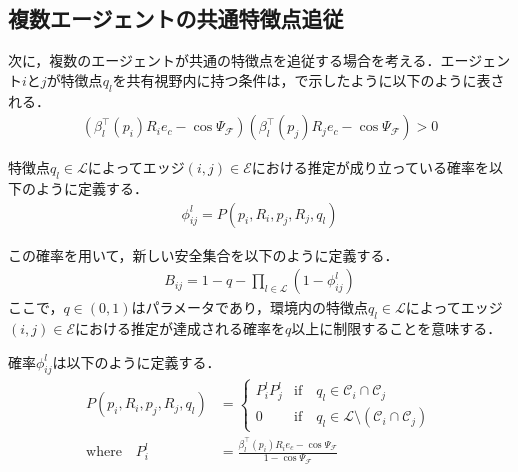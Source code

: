 \subsection{複数エージェントの共通特徴点追従}

次に，複数のエージェントが共通の特徴点を追従する場合を考える．エージェント$i$と$j$が特徴点$q_l$を共有視野内に持つ条件は，で示したように以下のように表される．
\begin{equation}
\begin{aligned}
(\beta_l^{\top}(p_i)R_ie_c-\cos\Psi_\mathcal{F})(\beta_l^{\top}(p_j)R_je_c-\cos\Psi_\mathcal{F}) > 0
\label{eq:shared_fov_condition_repeat}
\end{aligned}
\end{equation}

特徴点$q_l \in \mathcal{L}$によってエッジ$(i,j) \in \mathcal{E}$における推定が成り立っている確率を以下のように定義する．
\begin{equation}
\begin{aligned}
\phi_{ij}^l = P(p_i,R_i,p_j,R_j,q_l)
\label{eq:probability_edge}
\end{aligned}
\end{equation}

この確率を用いて，新しい安全集合を以下のように定義する．
\begin{equation}
\begin{aligned}
B_{ij} = 1-q-\prod_{l\in\mathcal{L}}(1-\phi_{ij}^l)
\label{eq:safe_set_edge}
\end{aligned}
\end{equation}
ここで，$q \in (0,1)$はパラメータであり，環境内の特徴点$q_l \in \mathcal{L}$によってエッジ$(i,j) \in \mathcal{E}$における推定が達成される確率を$q$以上に制限することを意味する．

確率$\phi_{ij}^l$は以下のように定義する．
\begin{equation}
\begin{aligned}
P(p_i,R_i,p_j,R_j,q_l) &= \left\{ \begin{array}{ll}
P_i^l P_j^l & \mathrm{if} \quad q_l\in\mathcal{C}_i \cap \mathcal{C}_j \\
0 & \mathrm{if} \quad q_l\in \mathcal{L}\setminus(\mathcal{C}_i \cap \mathcal{C}_j)
\end{array} \right. \\
\mathrm{where} \quad P_i^l &= \frac{\beta_l^\top(p_i) R_i e_c -\cos\Psi_\mathcal{F}}{1-\cos\Psi_\mathcal{F}}
\label{eq:probability_edge_definition}
\end{aligned}
\end{equation}

